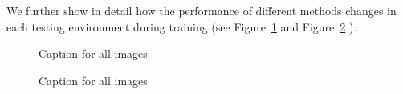 \documentclass{article}
\begin{document}
We further show in detail how the performance of different methods changes in each testing environment during training (see Figure~\ref{fig:10landers} and Figure~\ref{fig:10landers_2} ).
\begin{figure}[t]
\centering
{}
\caption{Caption for all images}
\label{fig:10landers}
\end{figure}

\begin{figure}[t]
\centering
{}
\caption{Caption for all images}
\label{fig:10landers_2}
\end{figure}
\end{document}
